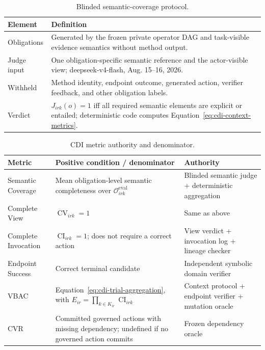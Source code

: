 \begin{table}[H]
\centering
\normalsize
\renewcommand{\arraystretch}{1.14}
\caption{Blinded semantic-coverage protocol.}
\begin{tabularx}{0.94\textwidth}{@{}p{} X@{}}
\toprule
\textbf{Element} & \textbf{Definition} \\
\midrule
Obligations & Generated by the frozen private operator DAG and task-visible evidence semantics without method output. \\
Judge input & One obligation-specific semantic reference and the actor-visible view; deepseek-v4-flash, Aug. 15--16, 2026. \\
Withheld & Method identity, endpoint outcome, generated action, verifier feedback, and other obligation labels. \\
Verdict & $J_{irk}(o)=1$ iff all required semantic elements are explicit or entailed; deterministic code computes Equation~\eqref{eq:cdi-context-metrics}. \\
\bottomrule
\end{tabularx}
\end{table}
\begin{table}[H]
\centering
\normalsize
\renewcommand{\arraystretch}{1.14}
\caption{CDI metric authority and denominator.}
\begin{tabularx}{0.95\textwidth}{@{}p{} p{} X@{}}
\toprule
\textbf{Metric} & \textbf{Positive condition / denominator} & \textbf{Authority} \\
\midrule
Semantic Coverage & Mean obligation-level semantic completeness over $\mathcal O^{\mathrm{eval}}_{irk}$ & Blinded semantic judge + deterministic aggregation \\
Complete View & $\operatorname{CV}_{irk}=1$ & Same as above \\
Complete Invocation & $\operatorname{CI}_{irk}=1$; does not require a correct action & View verdict + invocation log + lineage checker \\
Endpoint Success & Correct terminal candidate & Independent symbolic domain verifier \\
VBAC & Equation~\eqref{eq:cdi-trial-aggregation}, with $E_{ir}=\prod_{k\in K_{ir}}\operatorname{CI}_{irk}$ & Context protocol + endpoint verifier + mutation oracle \\
CVR & Committed governed actions with missing dependency; undefined if no governed action commits & Frozen dependency oracle \\
\bottomrule
\end{tabularx}
\end{table}

